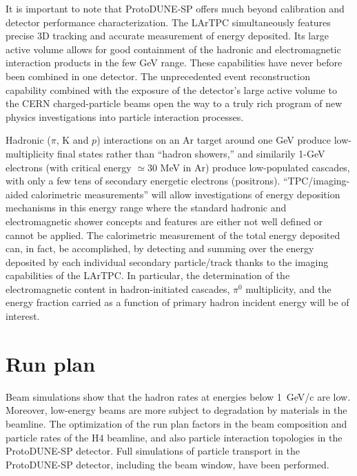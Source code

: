 {It is important to note that ProtoDUNE-SP offers much beyond calibration  and detector performance characterization.  The LArTPC simultaneously features precise 3D tracking and accurate measurement of energy deposited. Its large active volume allows for good containment of the hadronic and electromagnetic interaction products in the few GeV range. These capabilities have never before been combined in one detector.  The unprecedented event reconstruction capability combined with the exposure of the detector's large active volume to the CERN charged-particle beams open the way to a truly rich program of new physics investigations into particle interaction processes. 

  Hadronic ($\pi$, K and $p$) interactions on an Ar target around one GeV produce low-multiplicity final states rather than ``hadron showers,'' and similarily 1-GeV electrons  (with critical energy $\simeq 30$ MeV in Ar) produce low-populated cascades, with only a few tens of secondary energetic electrons (positrons).
``TPC/imaging-aided calorimetric measurements'' will allow investigations of energy deposition mechanisms in this energy range where the standard hadronic and electromagnetic shower concepts and features are either not well defined or cannot be applied.
The calorimetric measurement of the total energy deposited can, in fact, be accomplished, by detecting and summing over the energy deposited by each individual secondary particle/track thanks to the imaging capabilities of the LArTPC.
In particular, the determination of the electromagnetic  content in hadron-initiated cascades, $\pi^0$ multiplicity, and the energy fraction carried as a function of primary hadron incident energy will be of interest.

\section{Run plan}
\label{sec:runplan}


Beam simulations show that the hadron rates at 
energies below 1~GeV/c are low. Moreover, low-energy beams are more
subject to degradation by materials in the
beamline.  The optimization of the run plan factors in the beam composition and particle rates of the H4 beamline, and 
also particle interaction topologies in the ProtoDUNE-SP detector. Full 
simulations of particle transport in the ProtoDUNE-SP detector, including the
beam window, have been performed.


}
